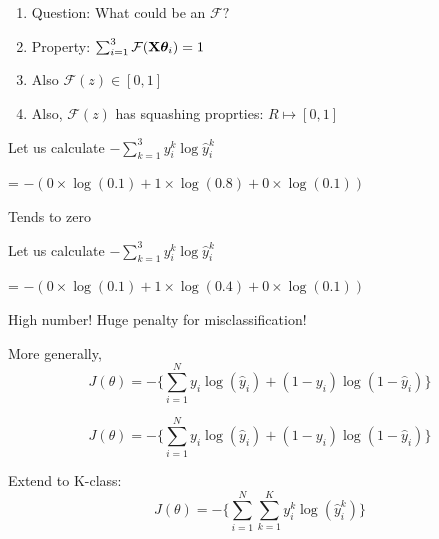 \documentclass{beamer}
\begin{document}
\begin{frame}\begin{enumerate}
	\item Question: What could be an $\mathcal{F}?$
	\item Property: $\sum_{i=1}^{3}\mathcal{F}{({\mathbf{X}\boldsymbol{\theta}_i})} = 1$
	\item Also $\mathcal{F}(z)\in [0, 1]$
	\item Also, $\mathcal{F}(z)$ has squashing proprties: $R \mapsto [0, 1]$
\end{enumerate}

\end{frame}
\begin{frame}Let us calculate $-\sum_{k=1}^{3}y_i^k \log{\hat{y}_i^k} $

\pause  = $-(0\times \log(0.1) + 1\times \log(0.8) + 0\times \log(0.1))$

\pause Tends to zero

\end{frame}

\begin{frame}Let us calculate $-\sum_{k=1}^{3}y_i^k \log{\hat{y}_i^k} $

\pause  = $-(0\times \log(0.1) + 1\times \log(0.4) + 0\times \log(0.1))$

\pause High number! Huge penalty for misclassification!

\end{frame}

\begin{frame}More generally, 
\pause \begin{equation*}
J(\theta) = -\bigg\{\sum_{i=1}^{N}y_{i}\log(\hat{y}_i) + (1 - y_{i})\log(1 - \hat{y}_i)\bigg\}
\end{equation*}

\pause \begin{equation*}
J(\theta) = -\bigg\{\sum_{i=1}^{N}y_{i}\log(\hat{y}_i) + (1 - y_{i})\log(1 - \hat{y}_i)\bigg\}
\end{equation*}

Extend to K-class:
\begin{equation*}
J(\theta) = -\bigg\{\sum_{i=1}^{N}\sum_{k=1}^{K}y_{i}^k\log(\hat{y}_{i}^k)\bigg\}
\end{equation*}
\end{frame}
\end{document}
